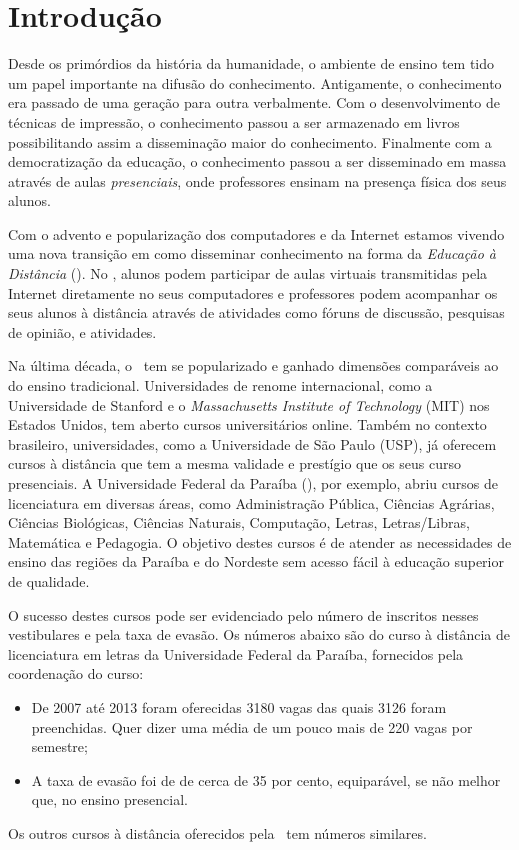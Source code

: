 \chapter{Introdução}


Desde os primórdios da história da humanidade, o ambiente de ensino tem tido um papel
importante na difusão do conhecimento. Antigamente, o conhecimento era passado de uma
geração para outra verbalmente. Com o desenvolvimento de técnicas de impressão, o conhecimento
passou a ser armazenado em livros possibilitando assim a disseminação maior do conhecimento. 
Finalmente com a democratização da educação, o conhecimento passou a ser disseminado em massa 
através de aulas \emph{presenciais}, onde professores ensinam na presença física dos seus alunos. 

Com o advento e popularização dos computadores e da Internet 
estamos vivendo uma nova transição em como disseminar conhecimento na forma da \emph{Educação à Distância} (\ead). 
No \ead, alunos podem participar de aulas virtuais transmitidas pela Internet diretamente no seus computadores
e professores podem acompanhar os seus alunos à distância através de atividades como 
fóruns de discussão, pesquisas de opinião, e atividades.

Na última década, o \ead\ tem se popularizado e ganhado dimensões comparáveis ao do ensino  
tradicional. Universidades de renome internacional, como a Universidade de Stanford e o \emph{Massachusetts Institute of 
Technology} (MIT) nos Estados Unidos, tem aberto cursos universitários online. Também no contexto brasileiro, 
universidades, como a Universidade de São Paulo (USP), já oferecem cursos 
à distância que tem a mesma validade e prestígio que os seus curso presenciais. 
A Universidade Federal da Paraíba (\ufpb), por exemplo, abriu cursos de licenciatura em 
diversas áreas, como Administração Pública, Ciências Agrárias, Ciências Biológicas, Ciências Naturais,
Computação, Letras, Letras/Libras, Matemática e Pedagogia. O objetivo destes cursos
é de atender as necessidades de ensino das regiões da Paraíba e do Nordeste sem acesso fácil
à educação superior de qualidade. 

O sucesso destes cursos pode ser evidenciado pelo número de inscritos nesses vestibulares e pela taxa de 
evasão. Os números abaixo são do curso à distância de licenciatura em letras da Universidade Federal da Paraíba, fornecidos pela 
coordenação do curso:
\begin{itemize}
 \item De 2007 até 2013 foram oferecidas 3180 vagas das quais 3126 foram preenchidas. 
 Quer dizer uma média de um pouco mais de 220 vagas por semestre;
 
 \item A taxa de evasão  foi de de cerca de 
35 por cento, equiparável, se não melhor que, no ensino presencial.
\end{itemize}
 Os outros cursos à distância oferecidos pela \ufpb\  tem números similares.

